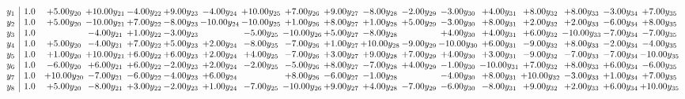 \documentclass[9pt]{article}
\begin{document}
\[\begin{array}{c| c c@{\hskip 2pt} c@{\hskip 2pt} c@{\hskip 2pt} c@{\hskip 2pt} c@{\hskip 2pt} c@{\hskip 2pt} c@{\hskip 2pt} c@{\hskip 2pt} c@{\hskip 2pt} c@{\hskip 2pt} c@{\hskip 2pt} c@{\hskip 2pt} c@{\hskip 2pt} c@{\hskip 2pt} c@{\hskip 2pt} c@{\hskip 2pt} }
 y_{1}   &  1.0 & +  5.00 y_{20} & + 10.00 y_{21} & -4.00 y_{22} & +  9.00 y_{23} & -4.00 y_{24} & + 10.00 y_{25} & +  7.00 y_{26} & +  9.00 y_{27} & -8.00 y_{28} & -2.00 y_{29} & -3.00 y_{30} & +  4.00 y_{31} & +  8.00 y_{32} & +  8.00 y_{33} & -3.00 y_{34} & +  7.00 y_{35}\\
 y_{2}   &  1.0 & +  5.00 y_{20} & -10.00 y_{21} & +  7.00 y_{22} & -8.00 y_{23} & -10.00 y_{24} & -10.00 y_{25} & +  1.00 y_{26} & +  8.00 y_{27} & +  1.00 y_{28} & +  5.00 y_{29} & -3.00 y_{30} & +  8.00 y_{31} & +  2.00 y_{32} & +  2.00 y_{33} & -6.00 y_{34} & +  8.00 y_{35}\\
 y_{3}   &  1.0  &   & -4.00 y_{21} & +  1.00 y_{22} & -3.00 y_{23} &   & -5.00 y_{25} & -10.00 y_{26} & +  5.00 y_{27} & -8.00 y_{28} &   & +  4.00 y_{30} & +  4.00 y_{31} & +  6.00 y_{32} & -10.00 y_{33} & -7.00 y_{34} & -7.00 y_{35}\\
 y_{4}   &  1.0 & +  5.00 y_{20} & -4.00 y_{21} & +  7.00 y_{22} & +  5.00 y_{23} & +  2.00 y_{24} & -8.00 y_{25} & -7.00 y_{26} & +  1.00 y_{27} & + 10.00 y_{28} & -9.00 y_{29} & -10.00 y_{30} & +  6.00 y_{31} & -9.00 y_{32} & +  8.00 y_{33} & -2.00 y_{34} & -4.00 y_{35}\\
 y_{5}   &  1.0 & +  1.00 y_{20} & + 10.00 y_{21} & +  6.00 y_{22} & +  6.00 y_{23} & +  2.00 y_{24} & +  4.00 y_{25} & -7.00 y_{26} & +  3.00 y_{27} & +  9.00 y_{28} & +  7.00 y_{29} & +  4.00 y_{30} & +  3.00 y_{31} & -9.00 y_{32} & -7.00 y_{33} & -7.00 y_{34} & -10.00 y_{35}\\
 y_{6}   &  1.0 & -6.00 y_{20} & +  6.00 y_{21} & +  6.00 y_{22} & -2.00 y_{23} & +  2.00 y_{24} & -2.00 y_{25} & -5.00 y_{26} & +  8.00 y_{27} & -7.00 y_{28} & +  4.00 y_{29} & -1.00 y_{30} & -10.00 y_{31} & +  7.00 y_{32} & +  8.00 y_{33} & +  6.00 y_{34} & -6.00 y_{35}\\
 y_{7}   &  1.0 & + 10.00 y_{20} & -7.00 y_{21} & -6.00 y_{22} & -4.00 y_{23} & +  6.00 y_{24} &   & +  8.00 y_{26} & -6.00 y_{27} & -1.00 y_{28} &   & -4.00 y_{30} & +  8.00 y_{31} & + 10.00 y_{32} & -3.00 y_{33} & +  1.00 y_{34} & +  7.00 y_{35}\\
 y_{8}   &  1.0 & +  5.00 y_{20} & -8.00 y_{21} & +  3.00 y_{22} & -2.00 y_{23} & +  1.00 y_{24} & -7.00 y_{25} & -10.00 y_{26} & +  9.00 y_{27} & +  4.00 y_{28} & -7.00 y_{29} & -6.00 y_{30} & -8.00 y_{31} & +  9.00 y_{32} & +  2.00 y_{33} & +  6.00 y_{34} & + 10.00 y_{35}\\

\end{array}\]
\end{document}
